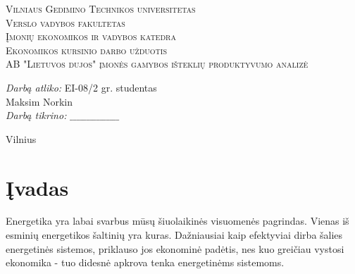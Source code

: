 \documentclass[11pt,a4paper]{article}
\begin{document}
\begin{titlepage}
  
  \begin{center}
    \textsc{\LARGE Vilniaus Gedimino Technikos universitetas}\\[2mm]
    \textsc{\Large Verslo vadybos fakultetas}\\[2mm]
    \textsc{\Large Įmonių ekonomikos ir vadybos katedra}\\[70mm]
    \textsc{\normalsize Ekonomikos kursinio darbo užduotis}\\[5mm]
    \textsc{\Large AB "Lietuvos dujos" įmonės gamybos išteklių produktyvumo analizė}\\[40mm]

    \begin{minipage}{1\textwidth}
      \begin{flushright}
        \emph{Darbą atliko:} EI-08/2 gr. studentas\\ Maksim Norkin\\
        \emph{Darbą tikrino:} $\_ \_ \_ \_ \_ \_ \_ \_ \_ \_ \_ \_ \_ \_ \_$\\
      \end{flushright}
    \end{minipage}
    \vfill
    {\large Vilnius \\ \the\year}
  \end{center}
\end{titlepage}
\setcounter{page}{2}
\tableofcontents
\newpage

\section*{Įvadas}

Energetika yra labai svarbus mūsų šiuolaikinės visuomenės pagrindas. Vienas iš 
esminių energetikos šaltinių yra kuras. Dažniausiai kaip efektyviai dirba
šalies energetinės sistemos, priklauso jos ekonominė padėtis, nes kuo 
greičiau vystosi ekonomika - tuo didesnė apkrova tenka energetinėms sistemoms.\\
\end{document}
